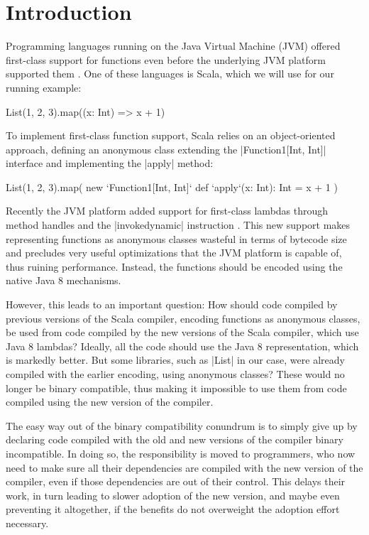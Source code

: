 \section{Introduction}

Programming languages running on the Java Virtual Machine (JVM) \cite{java-spec} offered first-class support for functions even before the underlying JVM platform supported them \cite{scala-odersky, xtend, kotlin, ceylon}. One of these languages is Scala, which we will use for our running example:

\begin{lstlisting-nobreak}
List(1, 2, 3).map((x: Int) => x + 1)
\end{lstlisting-nobreak}

To implement first-class function support, Scala relies on an object-oriented approach, defining an anonymous class extending the |Function1[Int, Int]| interface and implementing the |apply| method:

\begin{lstlisting-nobreak}
List(1, 2, 3).map(
  new `Function1[Int, Int]`{
    def `apply`(x: Int): Int = x + 1
  })
\end{lstlisting-nobreak}

Recently the JVM platform added support for first-class lambdas through method handles \cite{mhs} and the |invokedynamic| instruction \cite{forax-bytecodes-meet-combinators}. This new support makes representing functions as anonymous classes wasteful in terms of bytecode size and precludes very useful optimizations that the JVM platform is capable of, thus ruining performance. Instead, the functions should be encoded using the native Java 8 mechanisms.

However, this leads to an important question: How should code compiled by previous versions of the Scala compiler, encoding functions as anonymous classes, be used from code compiled by the new versions of the Scala compiler, which use Java 8 lambdas? Ideally, all the code should use the Java 8 representation, which is markedly better. But some libraries, such as |List| in our case, were already compiled with the earlier encoding, using anonymous classes? These would no longer be binary compatible, thus making it impossible to use them from code compiled using the new version of the compiler.

The easy way out of the binary compatibility conundrum is to simply give up by declaring code compiled with the old and new versions of the compiler binary incompatible. In doing so, the responsibility is moved to programmers, who now need to make sure all their dependencies are compiled with the new version of the compiler, even if those dependencies are out of their control. This delays their work, in turn leading to slower adoption of the new version, and maybe even preventing it altogether, if the benefits do not overweight the adoption effort necessary.

